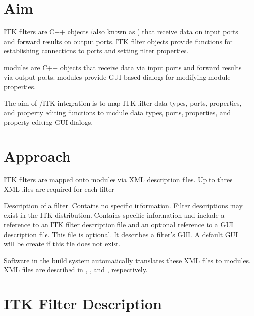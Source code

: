 \section{Aim}
\label{sec:itk_mods:aim}

ITK filters are C++ objects (also known as ) that
receive data on input ports and forward results on output ports.
ITK filter objects provide functions for establishing connections to
ports and setting filter properties.

\sr{} modules are C++ objects that receive data via input ports
and forward results via output ports.  \sr{} modules provide
GUI-based dialogs for modifying  module properties.

The aim of \sr{}/ITK integration is to map ITK filter data types,
ports, properties, and property editing functions to \sr{} module data
types, ports, properties, and property editing GUI dialogs.


\section{Approach}
\label{sec:itk_mods:approach}

ITK filters are mapped onto \sr{} modules via XML description files.
Up to three XML files are required for each filter:

\begin{description}
 Description of a filter.  Contains
no \sr{} specific information.  Filter descriptions may exist in the
ITK distribution.
 Contains \sr{} specific
information and include a reference to an ITK filter description file
and an optional reference to a GUI description file.
 This file is optional.  It describes a
filter's GUI.  A default GUI will be create if this file does not exist.
\end{description}

Software in the \sr{} build system automatically translates these XML
files to \sr{} modules.   XML files are described in
,
, and
,
respectively.


\section{ITK Filter Description}
\label{sec:itk_mods:itk_filter_desc}

